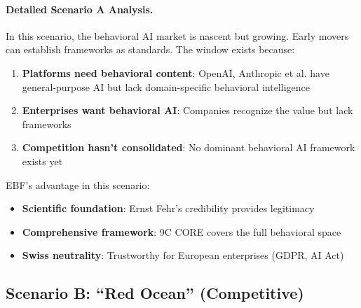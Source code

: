 \paragraph{Detailed Scenario A Analysis.}

In this scenario, the behavioral AI market is nascent but growing. Early movers can establish frameworks as standards. The window exists because:

\begin{enumerate}
\item \textbf{Platforms need behavioral content}: OpenAI, Anthropic et al. have general-purpose AI but lack domain-specific behavioral intelligence
\item \textbf{Enterprises want behavioral AI}: Companies recognize the value but lack frameworks
\item \textbf{Competition hasn't consolidated}: No dominant behavioral AI framework exists yet
\end{enumerate}

EBF's advantage in this scenario:
\begin{itemize}
\item \textbf{Scientific foundation}: Ernst Fehr's credibility provides legitimacy
\item \textbf{Comprehensive framework}: 9C CORE covers the full behavioral space
\item \textbf{Swiss neutrality}: Trustworthy for European enterprises (GDPR, AI Act)
\end{itemize}


\subsection{Scenario B: ``Red Ocean'' (Competitive)}

